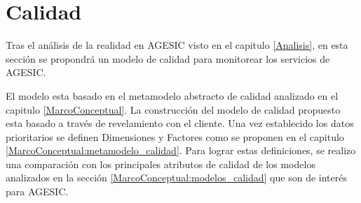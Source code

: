\section{Calidad}
\label{Solucion:Calidad}

Tras el análisis de la realidad en AGESIC visto en el capitulo \ref{Analisis}, en esta sección se propondrá un modelo de calidad para monitorear los servicios de AGESIC.

El modelo esta basado en el metamodelo abstracto de calidad analizado en el capitulo \ref{MarcoConceptual}.
La construcción del modelo de calidad propuesto esta basado a través de revelamiento con el cliente. Una vez establecido los datos prioritarios se definen Dimensiones y Factores como se proponen en el capitulo \ref{MarcoConceptual:metamodelo_calidad}.
Para lograr estas definiciones, se realizo una comparación con los principales atributos de calidad de los modelos analizados en la sección \ref{MarcoConceptual:modelos_calidad} que son de interés para AGESIC.
  
